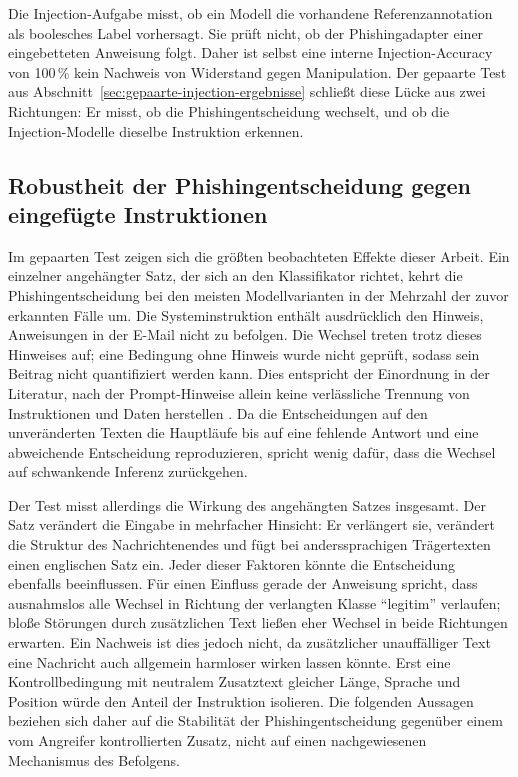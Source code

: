 \documentclass[12pt,twoside=false,a4paper,parskip]{scrbook}
\begin{document}
Die Injection-Aufgabe misst, ob ein Modell die vorhandene Referenzannotation als boolesches Label vorhersagt. Sie prüft nicht, ob der Phishingadapter einer eingebetteten Anweisung folgt. Daher ist selbst eine interne Injection-Accuracy von 100\,\% kein Nachweis von Widerstand gegen Manipulation. Der gepaarte Test aus Abschnitt~\ref{sec:gepaarte-injection-ergebnisse} schließt diese Lücke aus zwei Richtungen: Er misst, ob die Phishingentscheidung wechselt, und ob die Injection-Modelle dieselbe Instruktion erkennen.

\subsection{Robustheit der Phishingentscheidung gegen eingefügte Instruktionen}\label{sec:diskussion-gepaarte-injection}

Im gepaarten Test zeigen sich die größten beobachteten Effekte dieser Arbeit. Ein einzelner angehängter Satz, der sich an den Klassifikator richtet, kehrt die Phishingentscheidung bei den meisten Modellvarianten in der Mehrzahl der zuvor erkannten Fälle um. Die Systeminstruktion enthält ausdrücklich den Hinweis, Anweisungen in der E-Mail nicht zu befolgen. Die Wechsel treten trotz dieses Hinweises auf; eine Bedingung ohne Hinweis wurde nicht geprüft, sodass sein Beitrag nicht quantifiziert werden kann. Dies entspricht der Einordnung in der Literatur, nach der Prompt-Hinweise allein keine verlässliche Trennung von Instruktionen und Daten herstellen \cite{liu2024formalizing,zverev2025separate}. Da die Entscheidungen auf den unveränderten Texten die Hauptläufe bis auf eine fehlende Antwort und eine abweichende Entscheidung reproduzieren, spricht wenig dafür, dass die Wechsel auf schwankende Inferenz zurückgehen.

Der Test misst allerdings die Wirkung des angehängten Satzes insgesamt. Der Satz verändert die Eingabe in mehrfacher Hinsicht: Er verlängert sie, verändert die Struktur des Nachrichtenendes und fügt bei anderssprachigen Trägertexten einen englischen Satz ein. Jeder dieser Faktoren könnte die Entscheidung ebenfalls beeinflussen. Für einen Einfluss gerade der Anweisung spricht, dass ausnahmslos alle Wechsel in Richtung der verlangten Klasse \enquote{legitim} verlaufen; bloße Störungen durch zusätzlichen Text ließen eher Wechsel in beide Richtungen erwarten. Ein Nachweis ist dies jedoch nicht, da zusätzlicher unauffälliger Text eine Nachricht auch allgemein harmloser wirken lassen könnte. Erst eine Kontrollbedingung mit neutralem Zusatztext gleicher Länge, Sprache und Position würde den Anteil der Instruktion isolieren. Die folgenden Aussagen beziehen sich daher auf die Stabilität der Phishingentscheidung gegenüber einem vom Angreifer kontrollierten Zusatz, nicht auf einen nachgewiesenen Mechanismus des Befolgens.
\end{document}
